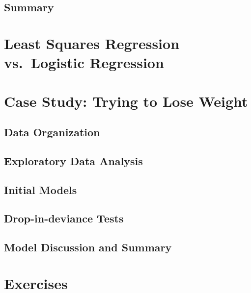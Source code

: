 \documentclass[
]{krantz}
\begin{document}
\hypertarget{summary-1}{%
\subsection{Summary}\label{summary-1}}

\hypertarget{least-squares-regression-vs.-logistic-regression}{%
\section{Least Squares Regression vs.~Logistic Regression}\label{least-squares-regression-vs.-logistic-regression}}

\hypertarget{case-study-trying-to-lose-weight}{%
\section{Case Study: Trying to Lose Weight}\label{case-study-trying-to-lose-weight}}

\hypertarget{data-organization-4}{%
\subsection{Data Organization}\label{data-organization-4}}

\hypertarget{exploratory-data-analysis-2}{%
\subsection{Exploratory Data Analysis}\label{exploratory-data-analysis-2}}

\hypertarget{initial-models-2}{%
\subsection{Initial Models}\label{initial-models-2}}

\hypertarget{drop-in-deviance-tests}{%
\subsection{Drop-in-deviance Tests}\label{drop-in-deviance-tests}}

\hypertarget{model-discussion-and-summary}{%
\subsection{Model Discussion and Summary}\label{model-discussion-and-summary}}

\hypertarget{exercises-5}{%
\section{Exercises}\label{exercises-5}}
\end{document}
